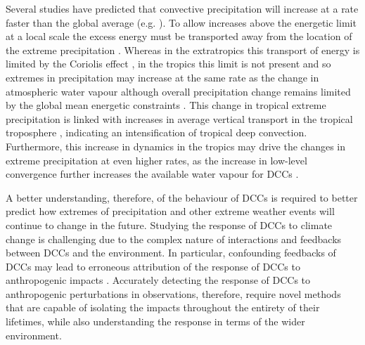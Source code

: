 Several studies have predicted that convective precipitation will increase at a rate faster than the global average (e.g. \citet{ogorman_physical_2009, muller_intensification_2011, ogorman_precipitation_2015, donat_more_2016}).
To allow increases above the energetic limit at a local scale the excess energy must be transported away from the location of the extreme precipitation \citep{muller_energetic_2011}.
Whereas in the extratropics this transport of energy is limited by the Coriolis effect \citep{ogorman_physical_2009}, in the tropics this limit is not present and so extremes in precipitation may increase at the same rate as the change in atmospheric water vapour \citep{ogorman_energetic_2012} although overall precipitation change remains limited by the global mean energetic constraints \citep{allen_constraints_2002}.
This change in tropical extreme precipitation is linked with increases in average vertical transport in the tropical troposphere \citep{muller_energetic_2011}, indicating an intensification of tropical deep convection.
Furthermore, this increase in dynamics in the tropics may drive the changes in extreme precipitation at even higher rates, as the increase in low-level convergence further increases the available water vapour for DCCs \citep{ogorman_energetic_2012}.

A better understanding, therefore, of the behaviour of DCCs is required to better predict how extremes of precipitation and other extreme weather events will continue to change in the future.
Studying the response of DCCs to climate change is challenging due to the complex nature of interactions and feedbacks between DCCs and the environment.
In particular, confounding feedbacks of DCCs may lead to erroneous attribution of the response of DCCs to anthropogenic impacts \citep{varble_erroneous_2018}.
Accurately detecting the response of DCCs to anthropogenic perturbations in observations, therefore, require novel methods that are capable of isolating the impacts throughout the entirety of their lifetimes, while also understanding the response in terms of the wider environment.


